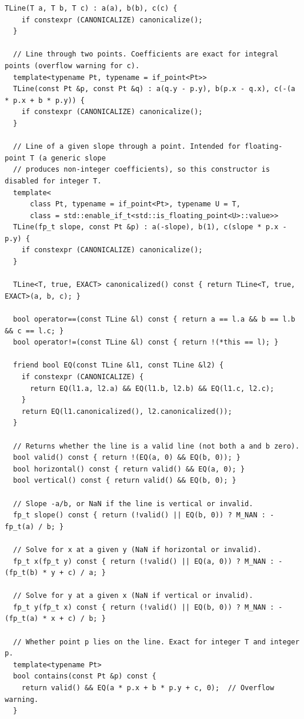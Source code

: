 \begin{lstlisting}[style=cpp]
  TLine(T a, T b, T c) : a(a), b(b), c(c) {
    if constexpr (CANONICALIZE) canonicalize();
  }

  // Line through two points. Coefficients are exact for integral points (overflow warning for c).
  template<typename Pt, typename = if_point<Pt>>
  TLine(const Pt &p, const Pt &q) : a(q.y - p.y), b(p.x - q.x), c(-(a * p.x + b * p.y)) {
    if constexpr (CANONICALIZE) canonicalize();
  }

  // Line of a given slope through a point. Intended for floating-point T (a generic slope
  // produces non-integer coefficients), so this constructor is disabled for integer T.
  template<
      class Pt, typename = if_point<Pt>, typename U = T,
      class = std::enable_if_t<std::is_floating_point<U>::value>>
  TLine(fp_t slope, const Pt &p) : a(-slope), b(1), c(slope * p.x - p.y) {
    if constexpr (CANONICALIZE) canonicalize();
  }

  TLine<T, true, EXACT> canonicalized() const { return TLine<T, true, EXACT>(a, b, c); }

  bool operator==(const TLine &l) const { return a == l.a && b == l.b && c == l.c; }
  bool operator!=(const TLine &l) const { return !(*this == l); }

  friend bool EQ(const TLine &l1, const TLine &l2) {
    if constexpr (CANONICALIZE) {
      return EQ(l1.a, l2.a) && EQ(l1.b, l2.b) && EQ(l1.c, l2.c);
    }
    return EQ(l1.canonicalized(), l2.canonicalized());
  }

  // Returns whether the line is a valid line (not both a and b zero).
  bool valid() const { return !(EQ(a, 0) && EQ(b, 0)); }
  bool horizontal() const { return valid() && EQ(a, 0); }
  bool vertical() const { return valid() && EQ(b, 0); }

  // Slope -a/b, or NaN if the line is vertical or invalid.
  fp_t slope() const { return (!valid() || EQ(b, 0)) ? M_NAN : -fp_t(a) / b; }

  // Solve for x at a given y (NaN if horizontal or invalid).
  fp_t x(fp_t y) const { return (!valid() || EQ(a, 0)) ? M_NAN : -(fp_t(b) * y + c) / a; }

  // Solve for y at a given x (NaN if vertical or invalid).
  fp_t y(fp_t x) const { return (!valid() || EQ(b, 0)) ? M_NAN : -(fp_t(a) * x + c) / b; }

  // Whether point p lies on the line. Exact for integer T and integer p.
  template<typename Pt>
  bool contains(const Pt &p) const {
    return valid() && EQ(a * p.x + b * p.y + c, 0);  // Overflow warning.
  }


\end{lstlisting}
